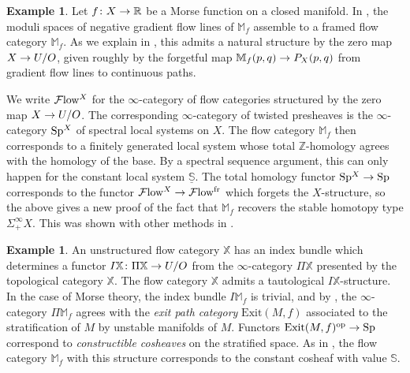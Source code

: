 \documentclass[10pt]{amsart}
\numberwithin{equation}{section}
\theoremstyle{definition}
\newtheorem{ex}[prop]{Example}
\DeclareMathOperator{\op}{op}
\newcommand{\fr}{\mathrm{fr}}
\newcommand{\Flow}{\cF\mathrm{low}\vphantom{w}}
\newcommand{\bM}{\mathbb{M}}
\newcommand{\bS}{\mathbb{S}}
\newcommand{\bZ}{\mathbb{Z}}
\newcommand{\bR}{\mathbb{R}}
\newcommand{\bX}{\mathbb{X}}
\newcommand{\cF}{\mathcal{F}}
\newcommand{\Sp}{\mathrm{Sp}\vphantom{p}}
\renewcommand{\to}{\mathchoice{\longrightarrow}{\rightarrow}{}{}}
\begin{document}
\begin{ex}\label{ex:morse_homotopy_type}
	Let $f\colon X\to \bR$ be a Morse function on a closed manifold.
  In \cite{cohen2020floer}, the moduli spaces of negative gradient flow lines of $\bM_{f}$ assemble to a framed flow category $\bM_{f}$.
  As we explain in , this admits a natural structure by the zero map $X\to U/O$, given roughly by the forgetful map $\bM_{f}(p,q) \to P_{X}(p,q)$ from gradient flow lines to continuous paths.

	We write $\Flow^{X}$ for the $\infty$-category of flow categories structured by the zero map $X\to U/O$.
  The corresponding $\infty$-category of twisted presheaves is the $\infty$-category $\Sp^{X}$ of spectral local systems on $X$.
  The flow category $\bM_{f}$ then corresponds to a finitely generated local system whose total $\bZ$-homology agrees with the homology of the base.
  By a spectral sequence argument, this can only happen for the constant local system $\underline{\bS}$.
  The total homology functor $\Sp^{X}\to \Sp$ corresponds to the functor $\Flow^{X}\to \Flow^{\fr}$ which forgets the $X$-structure, so the above gives a new proof of the fact that $\bM_{f}$ recovers the stable homotopy type $\Sigma^{\infty}_{+}X$.
  This was shown with other methods in \cite{abouzaid2021arnold, blakey2024floerhomotopytheorydegenerate,côté2024equivariantfloerhomotopymorsebott}.
\end{ex}
\begin{ex}
	An unstructured flow category $\bX$ has an index bundle which determines a functor $I\bX\colon \Pi\bX \to U/O$ from the $\infty$-category $\Pi\bX$ presented by the topological category $\bX$.
  The flow category $\bX$ admits a tautological $I\bX$-structure.
  In the case of Morse theory, the index bundle $I\bM_{f}$ is trivial, and by \cite{fourel2026}, the $\infty$-category $\Pi\bM_{f}$ agrees with the \emph{exit path category} $\mathrm{Exit}(M,f)$ associated to the stratification of $M$ by unstable manifolds of $M$.
  Functors $\mathrm{Exit}(M,f)^{\op} \to \Sp$ correspond to \emph{constructible cosheaves} on the stratified space.
  As in , the flow category $\bM_{f}$ with this structure corresponds to the constant cosheaf with value $\bS$.
\end{ex}
\end{document}
